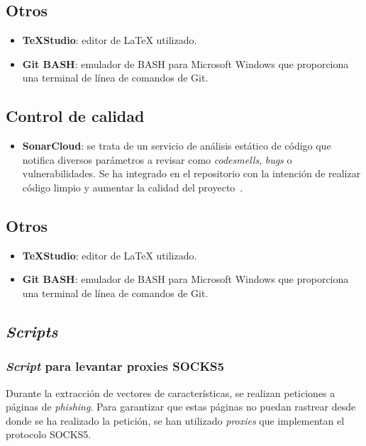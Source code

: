 \subsection{Otros}

\begin{itemize}
	\item \textbf{\TeX{}Studio}: editor de \LaTeX{} utilizado.
	\item \textbf{Git BASH}: emulador de BASH para Microsoft Windows que proporciona una terminal de línea de comandos de Git.
\end{itemize}

\subsection{Control de calidad}

\begin{itemize}
	\item \textbf{SonarCloud}: se trata de un servicio de análisis estático de código que notifica diversos parámetros a revisar como \textit{codesmells}, \textit{bugs} o vulnerabilidades. Se ha integrado en el repositorio con la intención de realizar código limpio y aumentar la calidad del proyecto~\cite{sonarCloud}.
\end{itemize}

\subsection{Otros}

\begin{itemize}
	\item \textbf{\TeX{}Studio}: editor de \LaTeX{} utilizado.
	\item \textbf{Git BASH}: emulador de BASH para Microsoft Windows que proporciona una terminal de línea de comandos de Git.
\end{itemize}


\subsection{\textit{Scripts}} 
\subsubsection{\textit{Script} para levantar proxies SOCKS5}

Durante la extracción de vectores de características, se realizan peticiones a páginas de \textit{phishing}. Para garantizar que estas páginas no puedan rastrear desde donde se ha realizado la petición, se han utilizado \textit{proxies} que implementan el protocolo SOCKS5.

